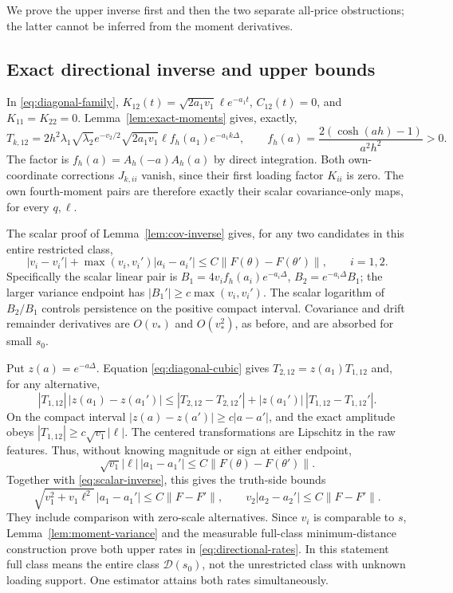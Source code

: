 \documentclass[11pt,a4paper]{amsart}
\theoremstyle{plain}
\theoremstyle{definition}
\theoremstyle{remark}
\begin{document}
We prove the upper inverse first and then the two separate all-price
obstructions; the latter cannot be inferred from the moment derivatives.

\subsection{Exact directional inverse and upper bounds}

In \eqref{eq:diagonal-family},
$K_{12}(t)=\sqrt{2a_1v_1}\ell e^{-a_1t}$, $C_{12}(t)=0$, and
$K_{11}=K_{22}=0$. Lemma~\ref{lem:exact-moments} gives, exactly,
\begin{equation}\label{eq:diagonal-cubic}
 T_{k,12}=2h^2\lambda_1\sqrt{\lambda_2}e^{-v_2/2}
          \sqrt{2a_1v_1}\ell f_h(a_1)e^{-a_1k\Delta},
 \qquad f_h(a)=\frac{2(\cosh(ah)-1)}{a^2h^2}>0.
\end{equation}
The factor is $f_h(a)=A_h(-a)A_h(a)$ by direct integration.
Both own-coordinate corrections $J_{k,ii}$ vanish, since their first
loading factor $K_{ii}$ is zero. The own fourth-moment pairs are therefore
exactly their scalar covariance-only maps, for every $q,\ell$.

The scalar proof of Lemma~\ref{lem:cov-inverse} gives, for any two
candidates in this entire restricted class,
\begin{equation}\label{eq:scalar-inverse}
 |v_i-v_i'|+\max(v_i,v_i')|a_i-a_i'|
          \le C\|F(\theta)-F(\theta')\|,
 \qquad i=1,2.
\end{equation}
Specifically the scalar linear pair is
$B_1=4v_i f_h(a_i)e^{-a_i\Delta}$, $B_2=e^{-a_i\Delta}B_1$;
the larger variance endpoint has $|B_1'|\ge c\max(v_i,v_i')$.
The scalar logarithm of $B_2/B_1$ controls persistence on the positive
compact interval. Covariance and drift remainder derivatives are
$O(v_*)$ and $O(v_*^2)$, as before, and are absorbed for small $s_0$.

Put $z(a)=e^{-a\Delta}$. Equation \eqref{eq:diagonal-cubic} gives
$T_{2,12}=z(a_1)T_{1,12}$ and, for any alternative,
\[
 |T_{1,12}|\,|z(a_1)-z(a_1')|
 \le|T_{2,12}-T_{2,12}'|
          +|z(a_1')|\,|T_{1,12}-T_{1,12}'|.
\]
On the compact interval $|z(a)-z(a')|\ge c|a-a'|$, and the exact
amplitude obeys $|T_{1,12}|\ge c\sqrt{v_1}|\ell|$. The centered
transformations are Lipschitz in the raw features. Thus, without knowing
magnitude or sign at either endpoint,
\begin{equation}\label{eq:scalar-leverage-inverse}
 \sqrt{v_1}|\ell|\,|a_1-a_1'|\le C\|F(\theta)-F(\theta')\|.
\end{equation}
Together with \eqref{eq:scalar-inverse}, this gives the truth-side bounds
\begin{equation}\label{eq:directional-inverse}
 \sqrt{v_1^2+v_1\ell^2}\,|a_1-a_1'|\le C\|F-F'\|,
 \qquad v_2|a_2-a_2'|\le C\|F-F'\|.
\end{equation}
They include comparison with zero-scale alternatives. Since $v_i$ is
comparable to $s$, Lemma~\ref{lem:moment-variance} and the measurable
full-class minimum-distance construction prove both upper rates in
\eqref{eq:directional-rates}. In this statement full class means the
entire class $\mathcal D(s_0)$, not the unrestricted class with unknown
loading support. One estimator attains both rates simultaneously.
\end{document}
